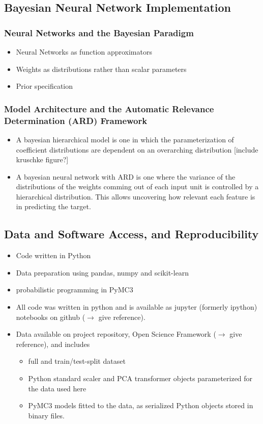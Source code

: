 \documentclass[10pt,a4paper]{article}
\begin{document}
		\subsection{Bayesian Neural Network Implementation}
			\subsubsection{Neural Networks and the Bayesian Paradigm}
				\begin{itemize}
					\item Neural Networks as function approximators
					\item Weights as distributions rather than scalar parameters
					\item Prior specification
				\end{itemize}
			\subsubsection{Model Architecture and the Automatic Relevance Determination (ARD) Framework}
				\begin{itemize}
				    \item A bayesian hierarchical model is one in which the parameterization of coefficient distributions are dependent on an overarching distribution [include kruschke figure?]
				    \item A bayesian neural network with ARD is one where the variance of the distributions of the weights comming out of each input unit is controlled by a hierarchical distribution. This allows uncovering how relevant each feature is in predicting the target.
				\end{itemize}
		\subsection{Data and Software Access, and Reproducibility}
		    \begin{itemize}
		        \item Code written in Python
		        \item Data preparation using pandas, numpy and scikit-learn
		        \item probabilistic programming in PyMC3
	            \item All code was written in python and is available as jupyter (formerly ipython) notebooks on github ($\rightarrow$ give reference). 
	            \item Data available on project repository, Open Science Framework ($\rightarrow$ give reference), and includes
	            \begin{itemize}
	                \item full and train/test-split dataset
	                \item Python standard scaler and PCA transformer objects parameterized for the data used here
	                \item PyMC3 models fitted to the data, as serialized Python objects stored in binary files.
    	        \end{itemize}
	       \end{itemize}
	\newpage
\end{document}

